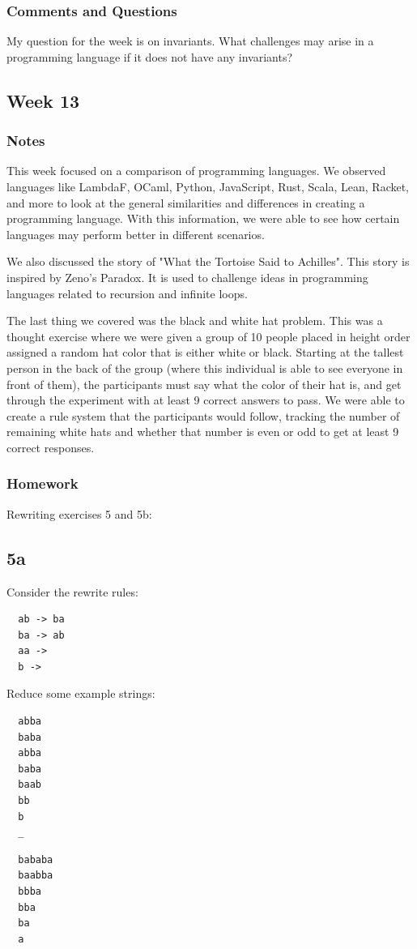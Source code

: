 \documentclass{article}
\theoremstyle{theorem}
\theoremstyle{definition}
\theoremstyle{remark}
\begin{document}
\subsubsection*{Comments and Questions}
My question for the week is on invariants. What challenges may arise in a programming
language if it does not have any invariants?
\subsection{Week 13}
\subsubsection*{Notes}
This week focused on a comparison of programming languages. We observed languages like 
LambdaF, OCaml, Python, JavaScript, Rust, Scala, Lean, Racket, and more to look at the 
general similarities and differences in creating a programming language. With this information,
we were able to see how certain languages may perform better in different scenarios. 

We also
discussed the story of "What the Tortoise Said to Achilles". This story is inspired by 
Zeno's Paradox. It is used to challenge ideas in programming languages related to recursion and 
infinite loops. 

The last thing we covered was the black and white hat problem. This was a thought exercise where we were 
given a group of 10 people placed in height order assigned a random hat color that is either white or black. 
Starting at the tallest person in the back of the group (where this individual is able to see everyone in 
front of them), the participants must say what the color of their hat is, and get through the experiment 
with at least 9 correct answers to pass. We were able to create a rule system that the participants would 
follow, tracking the number of remaining white hats and whether that number is even or odd to get at least 
9 correct responses. 
\subsubsection*{Homework}
Rewriting exercises 5 and 5b:

\subsection{5a}
Consider the rewrite rules:
\begin{verbatim}
  ab -> ba
  ba -> ab
  aa ->
  b ->
\end{verbatim}
Reduce some example strings:
\begin{verbatim}
  abba
  baba 
  abba 
  baba 
  baab 
  bb 
  b 
  _
\end{verbatim}
\begin{verbatim}
  bababa
  baabba 
  bbba 
  bba 
  ba 
  a 
\end{verbatim}
\end{document}

